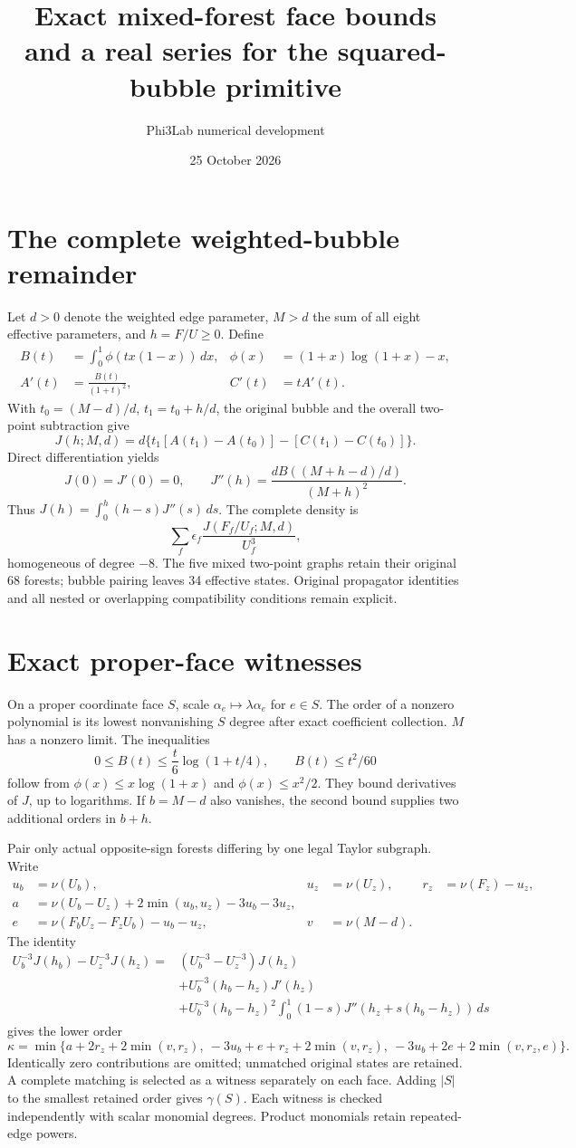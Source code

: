 \documentclass[11pt]{article}
\title{Exact mixed-forest face bounds and a real series for the squared-bubble primitive}
\author{Phi3Lab numerical development}
\date{25 October 2026}
\newcommand{\nuu}{\nu}
\begin{document}
\maketitle
\section{The complete weighted-bubble remainder}
Let $d>0$ denote the weighted edge parameter, $M>d$ the sum of all eight effective parameters, and $h=F/U\geq0$. Define
\begin{align*}
 B(t)&=\int_0^1\!\phi(tx(1-x))\,dx,&\phi(x)&=(1+x)\log(1+x)-x,\\
 A'(t)&=\frac{B(t)}{(1+t)^2},&C'(t)&=tA'(t).
\end{align*}
With $t_0=(M-d)/d$, $t_1=t_0+h/d$, the original bubble and the overall two-point subtraction give
\[
 J(h;M,d)=d\{t_1[A(t_1)-A(t_0)]-[C(t_1)-C(t_0)]\}.
\]
Direct differentiation yields
\[
 J(0)=J'(0)=0,\qquad J''(h)=\frac{d B((M+h-d)/d)}{(M+h)^2}.
\]
Thus $J(h)=\int_0^h(h-s)J''(s)\,ds$. The complete density is
\[
 \sum_f\epsilon_f\frac{J(F_f/U_f;M,d)}{U_f^3},
\]
homogeneous of degree $-8$. The five mixed two-point graphs retain their original 68 forests; bubble pairing leaves 34 effective states. Original propagator identities and all nested or overlapping compatibility conditions remain explicit.
\section{Exact proper-face witnesses}
On a proper coordinate face $S$, scale $\alpha_e\mapsto\lambda\alpha_e$ for $e\in S$. The order of a nonzero polynomial is its lowest nonvanishing $S$ degree after exact coefficient collection. $M$ has a nonzero limit. The inequalities
\[
 0\leq B(t)\leq\frac{t}{6}\log(1+t/4),\qquad B(t)\leq t^2/60
\]
follow from $\phi(x)\leq x\log(1+x)$ and $\phi(x)\leq x^2/2$. They bound derivatives of $J$, up to logarithms. If $b=M-d$ also vanishes, the second bound supplies two additional orders in $b+h$.

Pair only actual opposite-sign forests differing by one legal Taylor subgraph. Write
\begin{align*}
 u_b&=\nuu(U_b),&u_z&=\nuu(U_z),& r_z&=\nuu(F_z)-u_z,\\
 a&=\nuu(U_b-U_z)+2\min(u_b,u_z)-3u_b-3u_z,\\
 e&=\nuu(F_bU_z-F_zU_b)-u_b-u_z,& v&=\nuu(M-d).
\end{align*}
The identity
\begin{align*}
 U_b^{-3}J(h_b)-U_z^{-3}J(h_z)
 ={}&(U_b^{-3}-U_z^{-3})J(h_z)\\
 &+U_b^{-3}(h_b-h_z)J'(h_z)\\
 &+U_b^{-3}(h_b-h_z)^2\int_0^1(1-s)J''(h_z+s(h_b-h_z))\,ds
\end{align*}
gives the lower order
\[
 \kappa=\min\{a+2r_z+2\min(v,r_z),\ -3u_b+e+r_z+2\min(v,r_z),\ -3u_b+2e+2\min(v,r_z,e)\}.
\]
Identically zero contributions are omitted; unmatched original states are retained. A complete matching is selected as a witness separately on each face. Adding $|S|$ to the smallest retained order gives $\gamma(S)$. Each witness is checked independently with scalar monomial degrees. Product monomials retain repeated-edge powers.
\end{document}

